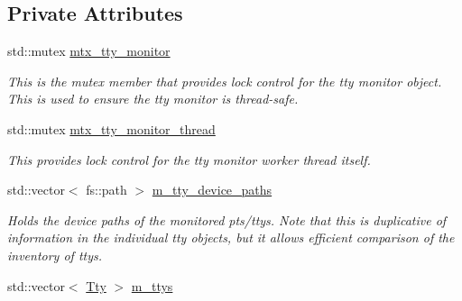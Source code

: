 \subsection*{Private Attributes}
\begin{DoxyCompactItemize}
\item 
\mbox{\label{classEventDetect_1_1TtyMonitor_a96ac4aec5d852d6d4271e98fba16bb95}} 
std\+::mutex \mbox{\hyperlink{classEventDetect_1_1TtyMonitor_a96ac4aec5d852d6d4271e98fba16bb95}{mtx\+\_\+tty\+\_\+monitor}}
\begin{DoxyCompactList}\small\item\em This is the mutex member that provides lock control for the tty monitor object. This is used to ensure the tty monitor is thread-\/safe. \end{DoxyCompactList}\item 
\mbox{\label{classEventDetect_1_1TtyMonitor_af0a17c0482162c9f74bb3e8b40d9c456}} 
std\+::mutex \mbox{\hyperlink{classEventDetect_1_1TtyMonitor_af0a17c0482162c9f74bb3e8b40d9c456}{mtx\+\_\+tty\+\_\+monitor\+\_\+thread}}
\begin{DoxyCompactList}\small\item\em This provides lock control for the tty monitor worker thread itself. \end{DoxyCompactList}\item 
\mbox{\label{classEventDetect_1_1TtyMonitor_aba414a40bfd7cf2e357df8b1a4b41e47}} 
std\+::vector$<$ fs\+::path $>$ \mbox{\hyperlink{classEventDetect_1_1TtyMonitor_aba414a40bfd7cf2e357df8b1a4b41e47}{m\+\_\+tty\+\_\+device\+\_\+paths}}
\begin{DoxyCompactList}\small\item\em Holds the device paths of the monitored pts/ttys. Note that this is duplicative of information in the individual tty objects, but it allows efficient comparison of the inventory of ttys. \end{DoxyCompactList}\item 
\mbox{\label{classEventDetect_1_1TtyMonitor_a1f094e24704b1f7b81c46120524f6820}} 
std\+::vector$<$ \mbox{\hyperlink{classEventDetect_1_1TtyMonitor_1_1Tty}{Tty}} $>$ \mbox{\hyperlink{classEventDetect_1_1TtyMonitor_a1f094e24704b1f7b81c46120524f6820}{m\+\_\+ttys}}

\end{DoxyCompactItemize}

